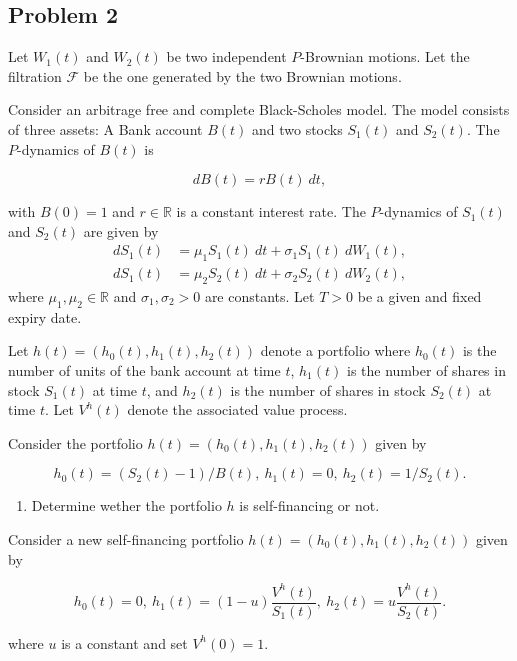 \documentclass[a4paper,12pt,openany]{book}
\providecommand{\tightlist}{%
 \setlength{\itemsep}{0pt}\setlength{\parskip}{0pt}}
\begin{document}
\noindent\makebox[\linewidth]{\rule{\textwidth}{0.4pt}}

\hypertarget{problem-2-3}{%
\subsection{Problem 2}\label{problem-2-3}}

Let \(W_1(t)\) and \(W_2(t)\) be two independent \(P\)-Brownian motions. Let the filtration \(\mathcal{F}\) be the one generated by the two Brownian motions.

Consider an arbitrage free and complete Black-Scholes model. The model consists of three assets: A Bank account \(B(t)\) and two stocks \(S_1(t)\) and \(S_2(t)\). The \(P\)-dynamics of \(B(t)\) is

\[
dB(t)=rB(t)\ dt,
\]

with \(B(0)=1\) and \(r\in\mathbb{R}\) is a constant interest rate. The \(P\)-dynamics of \(S_1(t)\) and \(S_2(t)\) are given by
\begin{align*}
dS_1(t)&=\mu_1S_1(t)\ dt+\sigma_1 S_1(t)\ dW_1(t),\\
dS_1(t)&=\mu_2S_2(t)\ dt+\sigma_2 S_2(t)\ dW_2(t),
\end{align*}
where \(\mu_1,\mu_2\in\mathbb{R}\) and \(\sigma_1,\sigma_2>0\) are constants. Let \(T>0\) be a given and fixed expiry date.

Let \(h(t)=(h_0(t),h_1(t),h_2(t))\) denote a portfolio where \(h_0(t)\) is the number of units of the bank account at time \(t\), \(h_1(t)\) is the number of shares in stock \(S_1(t)\) at time \(t\), and \(h_2(t)\) is the number of shares in stock \(S_2(t)\) at time \(t.\) Let \(V^h(t)\) denote the associated value process.

Consider the portfolio \(h(t)=(h_0(t),h_1(t),h_2(t))\) given by

\[
h_0(t)=(S_2(t)-1)/B(t),\ h_1(t)=0,\ h_2(t)=1/S_2(t).
\]

\begin{enumerate}
\def\labelenumi{\alph{enumi}.}
\tightlist
\item
  Determine wether the portfolio \(h\) is self-financing or not.
\end{enumerate}

Consider a new self-financing portfolio \(h(t)=(h_0(t),h_1(t),h_2(t))\) given by

\[
h_0(t)=0,\ h_1(t)=(1-u)\frac{V^h(t)}{S_1(t)},\ h_2(t)=u\frac{V^h(t)}{S_2(t)}.
\]

where \(u\) is a constant and set \(V^h(0)=1\).
\end{document}
